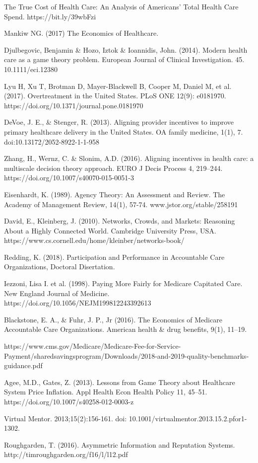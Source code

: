 \documentclass{article}
\begin{document}
\begin{thebibliography}{8}

The True Cost of Health Care: An Analysis of Americans’ Total Health Care Spend. https://bit.ly/39wbFzi

Mankiw NG. (2017) The Economics of Healthcare.

Djulbegovic, Benjamin \& Hozo, Iztok \& Ioannidis, John. (2014). Modern health care as a game theory problem. European Journal of Clinical Investigation. 45. 10.1111/eci.12380

Lyu H, Xu T, Brotman D, Mayer-Blackwell B, Cooper M, Daniel M, et al. (2017). Overtreatment in the United States. PLoS ONE 12(9): e0181970. https://doi.org/10.1371/journal.pone.0181970

DeVoe, J. E., \& Stenger, R. (2013). Aligning provider incentives to improve primary healthcare delivery in the United States. OA family medicine, 1(1), 7. doi:10.13172/2052-8922-1-1-958

Zhang, H., Wernz, C. \& Slonim, A.D. (2016). Aligning incentives in health care: a multiscale decision theory approach. EURO J Decis Process 4, 219–244. https://doi.org/10.1007/s40070-015-0051-3

Eisenhardt, K. (1989). Agency Theory: An Assessment and Review. The Academy of Management Review, 14(1), 57-74. www.jstor.org/stable/258191

David, E., Kleinberg, J. (2010). Networks, Crowds, and Markets: Reasoning About a Highly Connected World. Cambridge University Press, USA. https://www.cs.cornell.edu/home/kleinber/networks-book/

Redding, K. (2018). Participation and Performance in Accountable Care Organizations, Doctoral Disertation.

Iezzoni, Lisa I. et al. (1998). Paying More Fairly for Medicare Capitated Care. New England Journal of Medicine. https://doi.org/10.1056/NEJM199812243392613

Blackstone, E. A., \& Fuhr, J. P., Jr (2016). The Economics of Medicare Accountable Care Organizations. American health \& drug benefits, 9(1), 11–19.

https://www.cms.gov/Medicare/Medicare-Fee-for-Service-Payment/sharedsavingsprogram/Downloads\-/2018-and-2019-quality-benchmarks-guidance.pdf

Agee, M.D., Gates, Z. (2013). Lessons from Game Theory about Healthcare System Price Inflation. Appl Health Econ Health Policy 11, 45–51. https://doi.org/10.1007/s40258-012-0003-z

Virtual Mentor. 2013;15(2):156-161. doi: 10.1001/virtualmentor.2013.15.2.pfor1-1302.

Roughgarden, T. (2016). Asymmetric Information and Reputation Systems. http://timroughgarden.org/f16/l/l12.pdf

\end{thebibliography}

\end{document}
